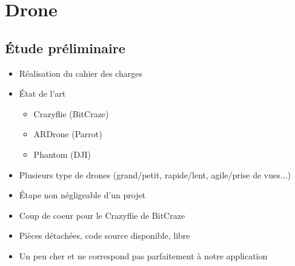 \documentclass{beamer}
\begin{document}
  {
    \section{Drone}
    
      \begin{frame}
	\tableofcontents[hideothersubsections]
      \end{frame}
    
      \subsection{Étude préliminaire}
	\begin{frame}
	  \begin{itemize}
	    \item Réalisation du cahier des charges
	    \item État de l'art
	    \begin{itemize}
	      \item Crazyflie (BitCraze)
	      \item ARDrone (Parrot)
	      \item Phantom (DJI)
	    \end{itemize}
	    \item Plusieurs type de drones (grand/petit, rapide/lent, agile/prise de vues...)
	    \item Étape non négligeable d'un projet
	  \end{itemize}
	\end{frame}
	
	\begin{frame}
	  \begin{itemize}
	    \item Coup de coeur pour le Crazyflie de BitCraze
	    \item Pièces détachées, code source disponible, libre
	    \item Un peu cher et ne correspond pas parfaitement à notre application
	  \end{itemize}
	\end{frame}
	
}
\end{document}
